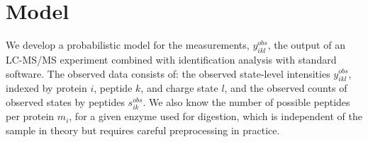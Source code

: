 

\section{Model}
\label{proteomics:sec:model}

We develop a probabilistic model for the measurements, $y_{ikl}^{obs}$, the output of an LC-MS/MS experiment combined with identification analysis with standard software.
The observed data consists of: the observed state-level intensities $y_{ikl}^{obs}$, indexed by protein $i$, peptide $k$, and charge state $l$, and the observed counts of observed states by peptides $s_{ik}^{obs}$.
We also know the number of possible peptides per protein $m_i$, for a given enzyme used for digestion, which is independent of the sample in theory but requires careful preprocessing in practice.

